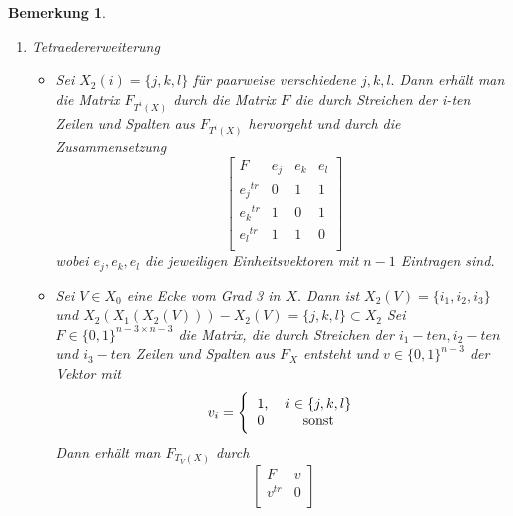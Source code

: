 \documentclass[12pt,titlepage,twoside,cleardoublepage]{article}
\theoremstyle{nummermitklammern}
\newtheorem{bemerkung}[temp]{Bemerkung}
\newtheorem{bemerkung}[zahl]{Bemerkung}
\numberwithin{equation}{section}
\begin{document}
\begin{bemerkung}
\begin{enumerate}
\begin{itemize}
\begin{align*}
&X_0(e)\cap X_0(j_1) \cap X_0(j_2)\neq \emptyset\\
\textcolor{black}{und} &X_0(e)\cap X_0(j_3) \cap X_0(j_4)\neq \emptyset\\
\end{align*}
erfüllen. Die Flächen-Inzidenz-Matrix $F_{X^e}\in \{0,1\}^{n\times n}$ erhält man durch
\[
{F_{X^e}}_{i,j}=
\Biggl{\{\begin{tabular}[l]{lcr}
1,&\textcolor{black}{$(i,j)\in \{(i_1,j_2),(j_2,i_1)\}$} \\
0,&\textcolor{black}{$(i,j)\in \{(i_1,j_3),(j_3,i_1)\}$} \\
1,&\textcolor{black}{$(i,j)\in \{(i_2,j_3),(j_3,i_2)\}$} \\
0,&\textcolor{black}{$(i,j)\in \{(i_2,j_2),(j_2,i_2)\}$} \\
$(F_{X})_{i,j}$,& sonst\\
\end{tabular}}
\]
\end{itemize}
\item Tetraedererweiterung
\begin{itemize}  
\item Sei $X_2(i)=\{j,k,l\}$ für paarweise verschiedene $j,k,l.$ Dann erhält man die Matrix $F_{T^i(X)}$ durch 
die Matrix $F$ die durch Streichen der i-ten Zeilen und Spalten aus $F_{T^i(X)}$ hervorgeht und durch die Zusammensetzung
\[
\left[ 
\begin{array}{c|ccc} 
  F & e_j& e_k &e_l \\ 
  \hline 
  {e_j}^{tr} & 0 & 1 & 1  \\
  {e_k}^{tr} & 1 & 0 & 1 \\
  {e_l}^{tr} & 1 & 1 & 0 \\
\end{array} 
\right]
\]
wobei $e_j,e_k,e_l$ die jeweiligen Einheitsvektoren mit $n-1$ Eintragen sind. 
\item Sei $V\in X_0$ eine Ecke vom Grad 3 in $X.$ Dann ist $X_2(V)=\{i_1,i_2,i_3\}$ und $X_2(X_1(X_2(V)))-X_2(V)=\{j,k,l\}\subset X_2$
Sei $F\in \{0,1\}^{n-3\times n-3}$ die Matrix, die durch Streichen der $i_1-ten,i_2-ten$ und $i_3-ten$ Zeilen und Spalten  aus $F_X$ entsteht und $v\in \{0,1\}^{n-3}$ der Vektor mit
\[
v_{i}=
\Biggl{\{\begin{tabular}[l]{lcr}
1,&\textcolor{black}{$i\in \{j,k,l\}$} \\
0& sonst\\
\end{tabular}}
\] Dann erhält man $F_{T_V(X)}$ durch 
\[
\left[ 
\begin{array}{c|ccc} 
  F & v \\ 
  \hline 
  {v}^{tr} & 0\\
\end{array} 
\right]
\]
\end{itemize}
\end{enumerate}

\end{bemerkung}
\end{document}
